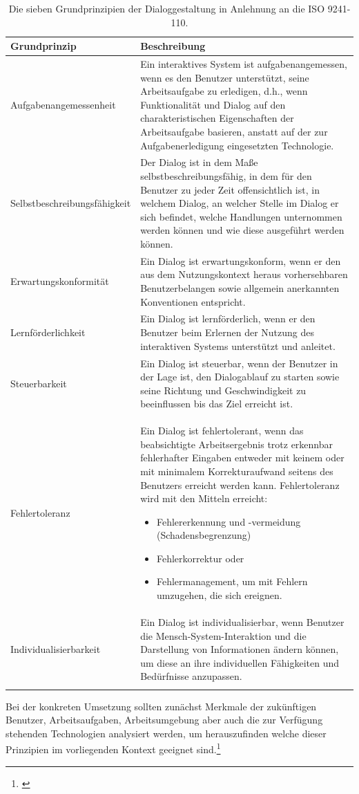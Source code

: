 \begin{center}
\begin{longtable}{|p{5.1cm}|p{9.5cm}|} 
\hline
\textbf{Grundprinzip} & \textbf{Beschreibung} \\ \hline
Aufgabenangemessenheit & Ein interaktives System ist aufgabenangemessen, wenn es den Benutzer unterstützt, seine Arbeitsaufgabe zu erledigen, d.h., wenn Funktionalität und Dialog auf den charakteristischen Eigenschaften der Arbeitsaufgabe basieren, anstatt auf der zur Aufgabenerledigung eingesetzten Technologie. \\ \hline
Selbstbeschreibungsfähigkeit & Der Dialog ist in dem Maße selbstbeschreibungsfähig, in dem für den Benutzer zu jeder Zeit offensichtlich ist, in welchem Dialog, an welcher Stelle im Dialog er sich befindet, welche Handlungen unternommen werden können und wie diese ausgeführt werden können. \\ \hline
Erwartungskonformität & Ein Dialog ist erwartungskonform, wenn er den aus dem Nutzungskontext heraus vorhersehbaren Benutzerbelangen sowie allgemein anerkannten Konventionen entspricht. \\ \hline
Lernförderlichkeit & Ein Dialog ist lernförderlich, wenn er den Benutzer beim Erlernen der Nutzung des interaktiven Systems unterstützt und anleitet. \\ \hline
Steuerbarkeit & Ein Dialog ist steuerbar, wenn der Benutzer in der Lage ist, den Dialogablauf zu starten sowie seine Richtung und Geschwindigkeit zu beeinflussen bis das Ziel erreicht ist. \\ \hline
Fehlertoleranz & Ein Dialog ist fehlertolerant, wenn das beabsichtigte Arbeitsergebnis trotz erkennbar fehlerhafter Eingaben entweder mit keinem oder mit minimalem Korrekturaufwand seitens des Benutzers erreicht werden kann. Fehlertoleranz wird mit den Mitteln erreicht: 
\begin{itemize}\itemsep0pt
  \item Fehlererkennung und -vermeidung (Schadensbegrenzung)
  \item Fehlerkorrektur oder
  \item Fehlermanagement, um mit Fehlern umzugehen, die sich ereignen.
\end{itemize} \\ \hline
Individualisierbarkeit & Ein Dialog ist individualisierbar, wenn Benutzer die Mensch-System-Interaktion und die Darstellung von Informationen ändern können, um diese an ihre individuellen Fähigkeiten und Bedürfnisse anzupassen.\\ \hline
\caption{Die sieben Grundprinzipien der Dialoggestaltung in Anlehnung an die ISO 9241-110.}
\label{tab:siebenGrundprinzipien}
\end{longtable}
\end{center}
Bei der konkreten Umsetzung sollten zunächst Merkmale der zukünftigen Benutzer, Arbeitsaufgaben, Arbeitsumgebung aber auch die zur Verfügung stehenden Technologien analysiert werden, um herauszufinden welche dieser Prinzipien im vorliegenden Kontext geeignet sind.\footnote{\cite[vgl.][]{Figl2010}}

